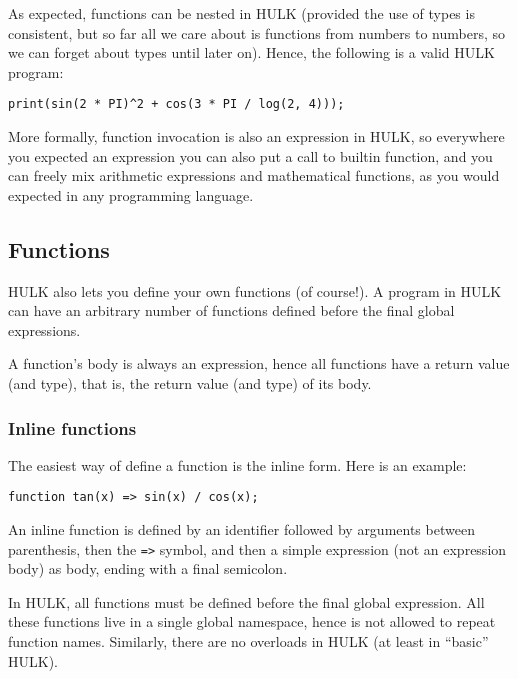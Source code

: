 \documentclass[a4paper, 12pt]{report}
\begin{document}
As expected, functions can be nested in HULK (provided the use of types is consistent, but so far all we
care about is functions from numbers to numbers, so we can forget about types until later on). Hence,
the following is a valid HULK program:

\begin{lstlisting}
print(sin(2 * PI)^2 + cos(3 * PI / log(2, 4)));
\end{lstlisting}

More formally, function invocation is also an expression in HULK, so everywhere you expected an expression
you can also put a call to builtin function, and you can freely mix arithmetic expressions and mathematical
functions, as you would expected in any programming language.

\subsection*{Functions}

HULK also lets you define your own functions (of course!). A program in HULK can have an arbitrary number of functions
defined before the final global expressions.

A function's body is always an expression, hence all functions have a return value (and type), that is, the return
value (and type) of its body.

\subsubsection*{Inline functions}

The easiest way of define a function is the inline form. Here is an example:

\begin{lstlisting}
function tan(x) => sin(x) / cos(x);
\end{lstlisting}

An inline function is defined by an identifier followed by arguments between parenthesis, 
then the {\tt =>} symbol, and then a simple expression (not an expression body) as body, 
ending with a final semicolon.

In HULK, all functions must be defined before the final global expression. All these functions live in a single
global namespace, hence is not allowed to repeat function names. Similarly, there are no overloads in HULK (at least in ``basic'' HULK).
\end{document}
